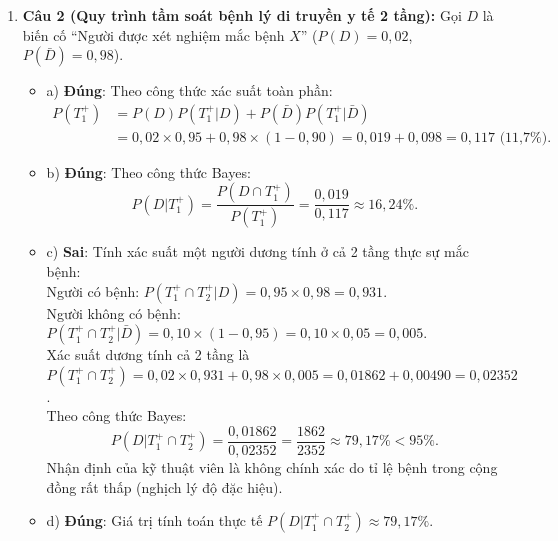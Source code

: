\documentclass[12pt,a4paper]{article}
\begin{document}
\begin{enumerate}[label=\textbf{Câu \arabic*:}, leftmargin=*]
\item \textbf{Câu 2 (Quy trình tầm soát bệnh lý di truyền y tế 2 tầng):}
Gọi $D$ là biến cố ``Người được xét nghiệm mắc bệnh $X$'' ($P(D) = 0{,}02$, $P(\bar{D}) = 0{,}98$).
\begin{itemize}
    \item a) \textbf{Đúng}: Theo công thức xác suất toàn phần:
    $$\begin{aligned}
    P(T_1^+) &= P(D)P(T_1^+ | D) + P(\bar{D})P(T_1^+ | \bar{D})\\
    &= 0{,}02 \times 0{,}95 + 0{,}98 \times (1 - 0{,}90) = 0{,}019 + 0{,}098 = 0{,}117\text{ (11,7\%)}.
    \end{aligned}$$
    \item b) \textbf{Đúng}: Theo công thức Bayes:
    $$P(D | T_1^+) = \dfrac{P(D \cap T_1^+)}{P(T_1^+)} = \dfrac{0{,}019}{0{,}117} \approx 16{,}24\%.$$
    \item c) \textbf{Sai}: Tính xác suất một người dương tính ở cả 2 tầng thực sự mắc bệnh:\\
    Người có bệnh: $P(T_1^+ \cap T_2^+ | D) = 0{,}95 \times 0{,}98 = 0{,}931$.\\
    Người không có bệnh: $P(T_1^+ \cap T_2^+ | \bar{D}) = 0{,}10 \times (1 - 0{,}95) = 0{,}10 \times 0{,}05 = 0{,}005$.\\
    Xác suất dương tính cả 2 tầng là $P(T_1^+ \cap T_2^+) = 0{,}02 \times 0{,}931 + 0{,}98 \times 0{,}005 = 0{,}01862 + 0{,}00490 = 0{,}02352$.\\
    Theo công thức Bayes:
    $$P(D | T_1^+ \cap T_2^+) = \dfrac{0{,}01862}{0{,}02352} = \dfrac{1862}{2352} \approx 79{,}17\% < 95\%.$$
    Nhận định của kỹ thuật viên là không chính xác do tỉ lệ bệnh trong cộng đồng rất thấp (nghịch lý độ đặc hiệu).
    \item d) \textbf{Đúng}: Giá trị tính toán thực tế $P(D | T_1^+ \cap T_2^+) \approx 79{,}17\%$.
\end{itemize}


\end{enumerate}
\end{document}
